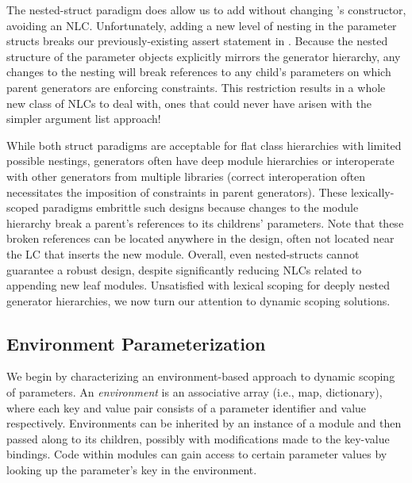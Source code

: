 The nested-struct paradigm does allow us to add  without changing 's constructor, avoiding an NLC.
Unfortunately, adding a new level of nesting in the parameter structs breaks our previously-existing assert statement in . 
Because the nested structure of the parameter objects explicitly mirrors the generator hierarchy,
any changes to the nesting will break references to any child's parameters on which parent generators are enforcing constraints.
This restriction results in a whole new class of NLCs to deal with, ones that could never have arisen with the simpler argument list approach!

While both struct paradigms are acceptable for flat class hierarchies with limited possible nestings,
generators often have deep module hierarchies or interoperate with other generators from multiple libraries
(correct interoperation often necessitates the imposition of constraints in parent generators).
These lexically-scoped paradigms embrittle such designs because changes to the module hierarchy break a parent's references to its childrens' parameters. 
Note that these broken references can be located anywhere in the design, often not located near the LC that inserts the new module.
Overall, even nested-structs cannot guarantee a robust design, despite significantly reducing NLCs related to appending new leaf modules.
Unsatisfied with lexical scoping for deeply nested generator hierarchies, we now turn our attention to dynamic scoping solutions.

\subsection{Environment Parameterization}
\label{sec:env}

We begin by characterizing an environment-based approach to dynamic scoping of parameters.
An \emph{environment} is an associative array (i.e., map, dictionary), where each key and value pair consists of a parameter identifier and value respectively.
Environments can be inherited by an instance of a module and then passed along to its children, possibly
with modifications made to the key-value bindings.
Code within modules can gain access to certain parameter values by looking up the parameter's key in the environment.

